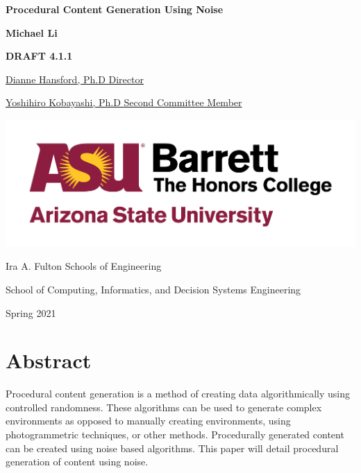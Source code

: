 \documentclass[10pt]{report}
\begin{document}
	\begin{titlepage}
		\begin{center}
			\Large
			\textbf{Procedural Content Generation Using Noise}
			
			\vspace{1.5cm}
			\normalsize
			\textbf{Michael Li}
			
			\vfill
			
			\textbf{DRAFT 4.1.1}
			
			\uline{Dianne Hansford, Ph.D \hfill Director}
			\vspace{1cm}
			
			\uline{Yoshihiro Kobayashi, Ph.D \hfill Second Committee Member}
			
			\vspace{3cm}
			
			\includegraphics[scale=.5]{asu_barretthonors_horiz_rgb_maroongold_600ppi}
			
			\vspace{1.5cm}
			Ira A. Fulton Schools of Engineering
			
			School of Computing, Informatics, and Decision Systems Engineering
			
			Spring 2021
			
		\end{center}
	\end{titlepage}
	
	\chapter*{Abstract}
	
	Procedural content generation is a method of creating data algorithmically using controlled randomness. These algorithms can be used to generate complex environments as opposed to manually creating environments, using photogrammetric techniques, or other methods. Procedurally generated content can be created using noise based algorithms. This paper will detail procedural generation of content using noise.
	
\end{document}
